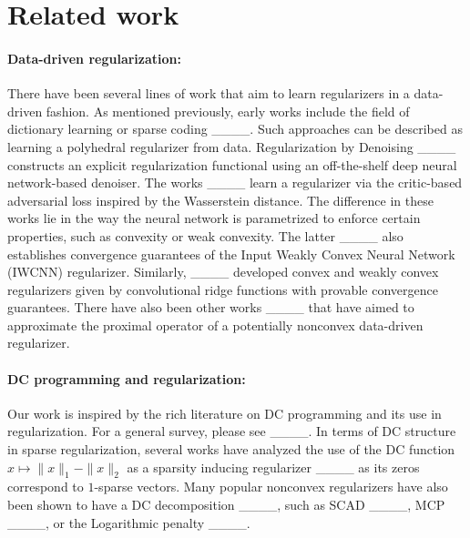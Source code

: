 \section{Related work}
\paragraph{Data-driven regularization:} There have been several lines of work that aim to learn regularizers in a data-driven fashion. As mentioned previously, early works include the field of dictionary learning or sparse coding ____. Such approaches can be described as learning a polyhedral regularizer from data. Regularization by Denoising ____ constructs an explicit regularization functional using an off-the-shelf deep neural network-based denoiser. The works ____ learn a regularizer via the critic-based adversarial loss inspired by the Wasserstein distance. The difference in these works lie in the way the neural network is parametrized to enforce certain properties, such as convexity or weak convexity. The latter ____ also establishes convergence guarantees of the Input Weakly Convex Neural Network (IWCNN) regularizer. Similarly, ____ developed convex and weakly convex regularizers given by convolutional ridge functions with provable convergence guarantees. There have also been other works ____ that have aimed to approximate the proximal operator of a potentially nonconvex data-driven regularizer.

\paragraph{DC programming and regularization:} Our work is inspired by the rich literature on DC programming and its use in regularization. For a general survey, please see ____. In terms of DC structure in sparse regularization, several works have analyzed the use of the DC function $x \mapsto \|x\|_1 - \|x\|_2$ as a sparsity inducing regularizer ____ as its zeros correspond to $1$-sparse vectors. Many popular nonconvex regularizers have also been shown to have a DC decomposition ____, such as SCAD ____, MCP ____, or the Logarithmic penalty ____.